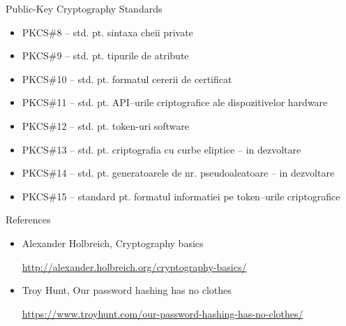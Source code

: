 \documentclass[pdf]{beamer}
\begin{document}
\begin{frame}{Public-Key Cryptography Standards}
\begin{itemize}
\item
PKCS\#8 – std. pt. sintaxa cheii private
\item
PKCS\#9 – std. pt. tipurile de atribute
\item
PKCS\#10 – std. pt. formatul cererii de certificat
\item
PKCS\#11 – std. pt. API–urile criptografice ale dispozitivelor hardware
\item
PKCS\#12 – std. pt. token-uri software 
\item
PKCS\#13 – std. pt. criptografia cu curbe eliptice – in dezvoltare
\item
PKCS\#14 – std. pt. generatoarele de nr. pseudoaleatoare – in dezvoltare
\item
PKCS\#15 – standard pt. formatul informatiei pe token–urile criptografice
\end{itemize}
\end{frame}



\begin{frame}{References}
\begin{itemize}
\item
Alexander Holbreich, Cryptography basics

\url{http://alexander.holbreich.org/cryptography-basics/}

\item
Troy Hunt, Our password hashing has no clothes

\url{https://www.troyhunt.com/our-password-hashing-has-no-clothes/}



\end{itemize}
\end{frame}
\end{document}
